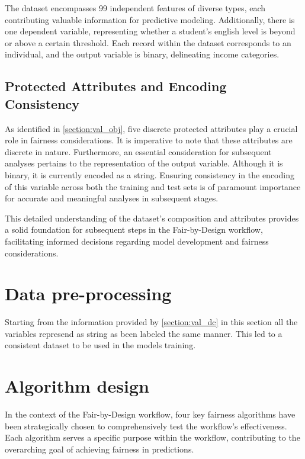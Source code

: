 The dataset encompasses 99 independent features of diverse types, each contributing valuable information for predictive modeling. Additionally, there is one dependent variable, representing whether a student's english level is beyond or above a certain threshold. Each record within the dataset corresponds to an individual, and the output variable is binary, delineating income categories.

\subsection{Protected Attributes and Encoding Consistency}

As identified in \cref{section:val_obj}, five discrete protected attributes play a crucial role in fairness considerations. It is imperative to note that these attributes are discrete in nature. Furthermore, an essential consideration for subsequent analyses pertains to the representation of the output variable. Although it is binary, it is currently encoded as a string. Ensuring consistency in the encoding of this variable across both the training and test sets is of paramount importance for accurate and meaningful analyses in subsequent stages.

This detailed understanding of the dataset's composition and attributes provides a solid foundation for subsequent steps in the Fair-by-Design workflow, facilitating informed decisions regarding model development and fairness considerations.

\section{Data pre-processing}

Starting from the information provided by \cref{section:val_dc} in this section all the variables represend as string as been labeled the same manner. This led to a consistent dataset to be used in the models training.

\section{Algorithm design}
\label{section:val_alg}

In the context of the Fair-by-Design workflow, four key fairness algorithms have been strategically chosen to comprehensively test the workflow's effectiveness. Each algorithm serves a specific purpose within the workflow, contributing to the overarching goal of achieving fairness in predictions.

